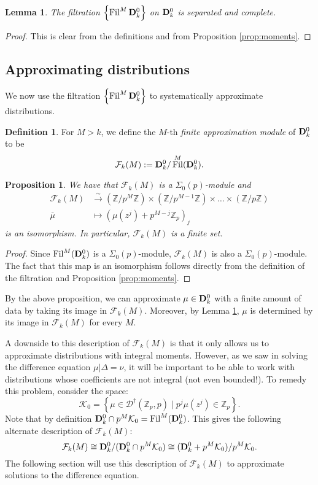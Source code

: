 \documentclass{amsart}
\theoremstyle{plain}
\newtheorem{prop}[thm]{Proposition}
\newtheorem{lemma}[thm]{Lemma}
\theoremstyle{definition}
\newtheorem{defn}[thm]{Definition}
\newcommand{\D}{{\mathcal D}}
\newcommand{\bD}{{\bf D}}
\newcommand{\F}{{\mathcal F}}
\newcommand{\K}{{\mathcal K}}
\newcommand{\Z}{{\mathbb Z}}
\newcommand{\Zp}{\Z_p}
\newcommand{\maps}{\rightarrow}
\newcommand{\sigop}{\Sigma_0(p)}
\newcommand{\Dvrig}[1]{\bD_{#1}}
\newcommand{\Dkrig}{\Dvrig{k}}
\newcommand{\Dkocv}[1]{\D^\dag(\Zp,#1)}
\newcommand{\FkM}{\F_k(M)}
\DeclareMathOperator{\Fil}{Fil}
\begin{document}
\begin{lemma}
\label{lemma:sepcom}
The filtration $\left\{ \Fil^M \Dkrig^0\right\}$ on $\Dkrig^0$ is separated and complete.
\end{lemma}

\begin{proof}
This is clear from the definitions and from Proposition \ref{prop:moments}.
\end{proof}


\subsection{Approximating distributions}

We now use the filtration $\left\{ \Fil^M \Dkrig^0\right\}$ to systematically approximate distributions.

\begin{defn}
For $M>k$, we define the $M$-th {\it finite approximation module} of $\Dkrig^0$ to be
$$
\FkM := \Dkrig^0 / \Fil^M(\Dkrig^0).
$$
\end{defn}

\vspace{.1cm}

\begin{prop}
\label{prop:finite}
We have that $\FkM$ is a $\sigop$-module and 
\begin{align*}
\FkM &\stackrel{\sim}{\maps} (\Z / p^M \Z) \times (\Z / p^{M-1} \Z) \times \dots \times (\Z / p \Z) \\
 \overline{\mu} &\mapsto \left(\mu(z^j) + p^{M-j} \Zp \right)_j
\end{align*}
is an isomorphism.  In particular, $\FkM$ is a finite set.
\end{prop}

\begin{proof}
Since $\Fil^M(\Dkrig^0)$ is a $\sigop$-module, $\FkM$ is also a $\sigop$-module.   The fact that this map is an isomorphism follows
directly from the definition of the filtration and Proposition \ref{prop:moments}.
\end{proof}

By the above proposition, we can approximate $\mu \in \Dkrig^0$ with a finite amount of data by taking its image in $\FkM$.  Moreover, by Lemma \ref{lemma:sepcom}, $\mu$ is determined by its image in $\FkM$ for every $M$.


A downside to this description of $\FkM$ is that it only allows us to approximate distributions with integral moments.
However, as we saw in solving the difference equation $\mu \big| \Delta = \nu$, it will be important to be able to work with distributions whose
coefficients are not integral (not even bounded!).  To remedy this problem, consider the space:
$$ 
\K_0 = \left\{ \mu \in \Dkocv{p} \mid p^j \mu(z^j) \in \Zp 
\right\}.
$$
Note that by definition $\Dkrig^0 \cap p^M \K_0 =
\Fil^M(\Dkrig^0)$.  This gives the following alternate description of
$\FkM$:
$$
\FkM \cong  \Dkrig^0 / (\Dkrig^0 \cap p^M \K_0) \cong (\Dkrig^0 + p^M \K_0) / p^M \K_0.
$$
The following section will use this description of $\FkM$ to approximate solutions to the difference equation.
\end{document}
